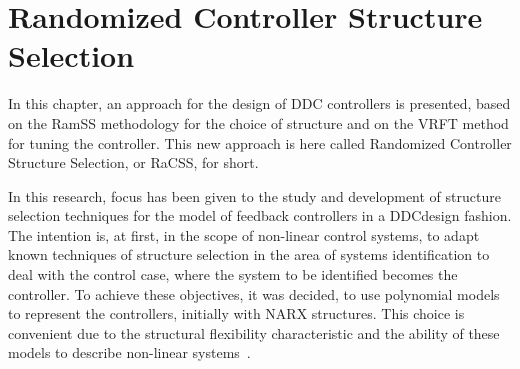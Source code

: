

\chapter{Randomized Controller Structure Selection}\label{cap:CCS}
\vspace{-1cm}

%
%


In this chapter, an approach for the design of DDC controllers is presented, based on the RamSS methodology for the choice of structure and on the VRFT method for tuning the controller. This new approach is here called Randomized Controller Structure Selection, or RaCSS, for short.

In this research, focus has been given to the study and development of structure selection techniques for the model of feedback controllers in a DDC\@ design fashion.
The intention is, at first, in the scope of non-linear control systems, to adapt known techniques of structure selection in the area of systems identification to deal with the control case, where the system to be identified becomes the controller. To achieve these objectives, it was decided, to use polynomial models to represent the controllers, initially with NARX structures. This choice is convenient due to the structural flexibility characteristic and the ability of these models to describe non-linear systems~\citep{pearson1999, martins2013}.
%

